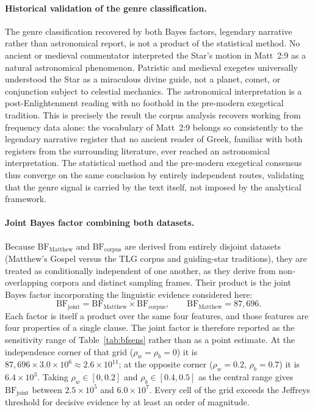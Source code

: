 \documentclass[11pt,a4paper]{article}
\begin{document}
\paragraph{Historical validation of the genre classification.}

The genre classification recovered by both Bayes factors, legendary narrative
rather than astronomical report, is not a product of the statistical method.
No ancient or medieval commentator interpreted the Star's motion in Matt~2:9
as a natural astronomical phenomenon\cite{adair2012}. Patristic and medieval
exegetes universally understood the Star as a miraculous divine guide, not a
planet, comet, or conjunction subject to celestial mechanics. The astronomical
interpretation is a post-Enlightenment reading with no foothold in the
pre-modern exegetical tradition. This is precisely the result the corpus
analysis recovers working from frequency data alone: the vocabulary of Matt~2:9
belongs so consistently to the legendary narrative register that no ancient
reader of Greek, familiar with both registers from the surrounding literature,
ever reached an astronomical interpretation. The statistical method and the
pre-modern exegetical consensus thus converge on the same conclusion by entirely
independent routes, validating that the genre signal is carried by the text
itself, not imposed by the analytical framework.

\paragraph{Joint Bayes factor combining both datasets.}

Because $\mathrm{BF}_\text{Matthew}$ and $\mathrm{BF}_\text{corpus}$ are derived
from entirely disjoint datasets (Matthew's Gospel versus the TLG corpus and
guiding-star traditions), they are treated as conditionally independent of one
another, as they derive from non-overlapping corpora and distinct sampling
frames. Their product is the joint Bayes factor incorporating the linguistic
evidence considered here:
\begin{equation}
  \mathrm{BF}_\text{joint}
    = \mathrm{BF}_\text{Matthew} \times \mathrm{BF}_\text{corpus},
    \qquad \mathrm{BF}_\text{Matthew} = 87{,}696 .
  \label{eq:bf_joint}
\end{equation}
Each factor is itself a product over the same four features, and those features
are four properties of a single clause. The joint factor is therefore reported
as the sensitivity range of Table~\ref{tab:bfsens} rather than as a point
estimate. At the independence corner of that grid
($\rho_w = \rho_b = 0$) it is $87{,}696 \times 3.0\times10^{6} \approx
2.6\times10^{11}$; at the opposite corner ($\rho_w = 0.2$, $\rho_b = 0.7$) it
is $6.4\times10^{3}$. Taking $\rho_w \in [0, 0.2]$ and
$\rho_b \in [0.4, 0.5]$ as the central range gives $\mathrm{BF}_\text{joint}$
between $2.5\times10^{5}$ and $6.0\times10^{7}$. Every cell of the grid
exceeds the Jeffreys threshold for decisive evidence by at least an order of
magnitude.
\end{document}
